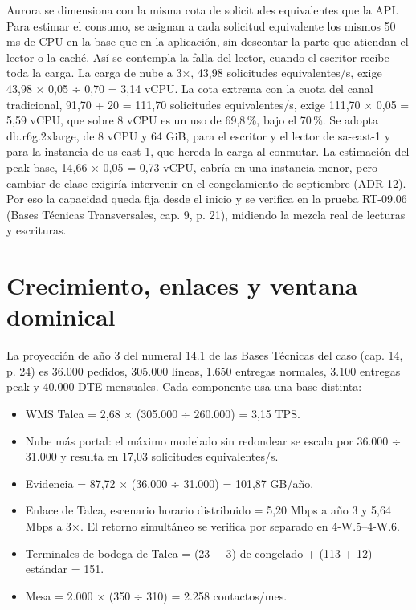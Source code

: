 Aurora se dimensiona con la misma cota de solicitudes equivalentes que la API. Para estimar el consumo, se asignan a cada solicitud equivalente los mismos 50 ms de CPU en la base que en la aplicación, sin descontar la parte que atiendan el lector o la caché. Así se contempla la falla del lector, cuando el escritor recibe toda la carga. La carga de nube a 3×, 43,98 solicitudes equivalentes/s, exige 43,98 × 0,05 ÷ 0,70 = 3,14 vCPU. La cota extrema con la cuota del canal tradicional, 91,70 + 20 = 111,70 solicitudes equivalentes/s, exige 111,70 × 0,05 = 5,59 vCPU, que sobre 8 vCPU es un uso de 69,8\,\%, bajo el 70\,\%. Se adopta db.r6g.2xlarge, de 8 vCPU y 64 GiB, para el escritor y el lector de sa-east-1 y para la instancia de us-east-1, que hereda la carga al conmutar. La estimación del peak base, 14,66 × 0,05 = 0,73 vCPU, cabría en una instancia menor, pero cambiar de clase exigiría intervenir en el congelamiento de septiembre (ADR-12). Por eso la capacidad queda fija desde el inicio y se verifica en la prueba RT-09.06 (Bases Técnicas Transversales, cap. 9, p. 21), midiendo la mezcla real de lecturas y escrituras.

\section{Crecimiento, enlaces y ventana dominical}
\label{sec:anexo-4b-crecimiento}

La proyección de año 3 del numeral 14.1 de las Bases Técnicas del caso (cap. 14, p. 24) es 36.000 pedidos, 305.000 líneas, 1.650 entregas normales, 3.100 entregas peak y 40.000 DTE mensuales. Cada componente usa una base distinta:

\begin{itemize}
  \item WMS Talca = 2,68 × (305.000 ÷ 260.000) = 3,15 TPS.
  \item Nube más portal: el máximo modelado sin redondear se escala por 36.000 ÷ 31.000 y resulta en 17,03 solicitudes equivalentes/s.
  \item Evidencia = 87,72 × (36.000 ÷ 31.000) = 101,87 GB/año.
  \item Enlace de Talca, escenario horario distribuido = 5,20 Mbps a año 3 y 5,64 Mbps a 3×. El retorno simultáneo se verifica por separado en 4-W.5–4-W.6.
  \item Terminales de bodega de Talca = (23 + 3) de congelado + (113 + 12) estándar = 151.
  \item Mesa = 2.000 × (350 ÷ 310) = 2.258 contactos/mes.
\end{itemize}

